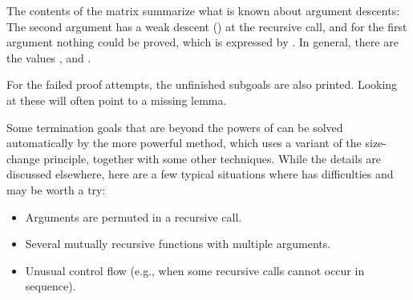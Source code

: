 \begin{isabellebody}
\begin{isamarkuptext}
  The contents of the matrix summarize what is known about argument
  descents: The second argument has a weak descent () at the
  recursive call, and for the first argument nothing could be proved,
  which is expressed by . In general, there are the values
  ,  and .

  For the failed proof attempts, the unfinished subgoals are also
  printed. Looking at these will often point to a missing lemma.%
\end{isamarkuptext}%
\isamarkuptrue%
%
\isamarkuptrue%
%
\begin{isamarkuptext}%
Some termination goals that are beyond the powers of
   can be solved automatically by the
  more powerful  method, which uses a variant of
  the size-change principle, together with some other
  techniques. While the details are discussed
  elsewhere\cite{krauss_phd},
  here are a few typical situations where
   has difficulties and 
  may be worth a try:
  \begin{itemize}
  \item Arguments are permuted in a recursive call.
  \item Several mutually recursive functions with multiple arguments.
  \item Unusual control flow (e.g., when some recursive calls cannot
  occur in sequence).
  \end{itemize}


\end{isamarkuptext}
\end{isabellebody}
